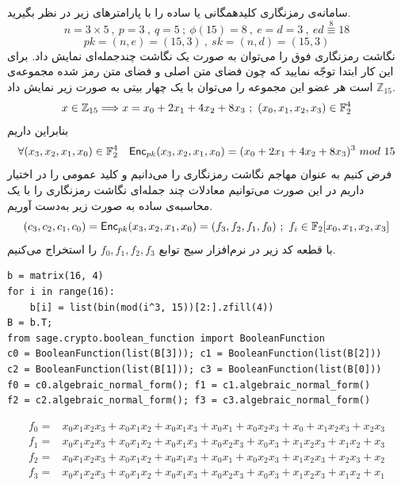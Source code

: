 \begin{example}
	سامانه‌ی رمزنگاری کلیدهمگانی 
	یا 
	ساده را با پارامترهای زیر در نظر بگیرید.
	$$n = 3\times 5 \ , \ p = 3 \ , \ q = 5 \ ; \ \phi(15) = 8 \ , \ e = d = 3 \ , \ ed  \stackrel{8}{\equiv} 18$$
	$$pk = (n,e) = (15,3) \ , \ sk = (n,d) = (15,3)$$
	نگاشت رمزنگاری فوق را می‌توان به صورت یک نگاشت چندجمله‌ای نمایش داد. برای این کار ابتدا توجّه نمایید که چون فضای متن اصلی و فضای متن رمز شده مجموعه‌ی 
	$\mathbb{Z}_{15}$
	است هر عضو این مجموعه‌ را می‌توان با یک چهار بیتی به صورت زیر نمایش داد.
	$$x\in\mathbb{Z}_{15}\Longrightarrow x = x_{0} + 2x_{1}+4x_{2}+8x_{3} \ ; \ (x_0,x_1,x_2,x_3)\in\ffld_{2}^4$$
	بنابراین داریم
	$$\forall(x_3,x_2,x_1,x_0)\in\ffld_{2}^4 \  \  \ \Enc_{pk}(x_{3},x_{2},x_{1},x_{0}) = (x_{0}+2x_{1}+4x_{2}+8x_{3})^{3} \ mod \ 15$$
	فرض کنیم به عنوان مهاجم نگاشت رمزنگاری را می‌دانیم و کلید عمومی را در اختیار داریم در این صورت می‌توانیم معادلات چند جمله‌ای نگاشت رمزنگاری را با یک محاسبه‌ی ساده به صورت زیر به‌دست آوریم.
	$$(c_3,c_2,c_1,c_0) = \mathsf{Enc}_{pk}(x_3,x_2,x_1,x_0) = (f_{3},f_{2},f_{1},f_{0})\ ; \ f_{i}\in \mathbb{F}_{2}[x_0,x_1,x_2,x_3]$$
	با قطعه کد زیر در نرم‌افزار سیج توابع 
	$f_{0},f_{1},f_{2},f_{3}$
	را استخراج می‌کنیم. 
\begin{latin}
\begin{flushleft}
\begin{lstlisting}
b = matrix(16, 4)
for i in range(16):
    b[i] = list(bin(mod(i^3, 15))[2:].zfill(4))
B = b.T;
from sage.crypto.boolean_function import BooleanFunction
c0 = BooleanFunction(list(B[3])); c1 = BooleanFunction(list(B[2]))
c2 = BooleanFunction(list(B[1])); c3 = BooleanFunction(list(B[0]))
f0 = c0.algebraic_normal_form(); f1 = c1.algebraic_normal_form()
f2 = c2.algebraic_normal_form(); f3 = c3.algebraic_normal_form()
\end{lstlisting}
\end{flushleft}
\end{latin}
\begin{align*}
	f_{0} =& x_{0} x_{1} x_{2} x_{3} + x_{0} x_{1} x_{2} + x_{0} x_{1} x_{3} + x_{0} x_{1} + x_{0} x_{2} x_{3} + x_{0} + x_{1} x_{2} x_{3} + x_{2} x_{3}\\
	f_{1} =& x_{0} x_{1} x_{2} x_{3} + x_{0} x_{1} x_{2} + x_{0} x_{1} x_{3} + x_{0}
	x_{2} x_{3} + x_{0} x_{3} + x_{1} x_{2} x_{3} + x_{1} x_{2} + x_{3}\\
	f_{2} =& x_{0} x_{1} x_{2} x_{3} + x_{0} x_{1} x_{2} + x_{0} x_{1} x_{3} + x_{0}
	x_{1} + x_{0} x_{2} x_{3} + x_{1} x_{2} x_{3} + x_{2} x_{3} + x_{2}\\
	f_{3} =& x_{0} x_{1} x_{2} x_{3} + x_{0} x_{1} x_{2} + x_{0} x_{1} x_{3} + x_{0}
	x_{2} x_{3} + x_{0} x_{3} + x_{1} x_{2} x_{3} + x_{1} x_{2} + x_{1}
\end{align*}
	

\end{example}
